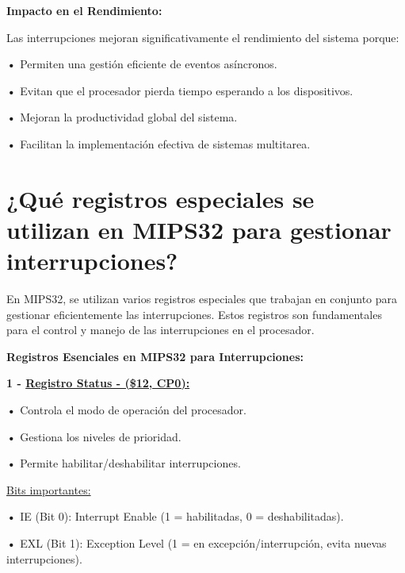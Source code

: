 \documentclass{article}
\begin{document}
\textbf{Impacto en el Rendimiento: }

\quad

{Las interrupciones mejoran significativamente el rendimiento del sistema porque:}

\quad

\textbf{    •} { Permiten una gestión eficiente de eventos asíncronos.}

\textbf{    •} { Evitan que el procesador pierda tiempo esperando a los dispositivos.}

\textbf{    •} { Mejoran la productividad global del sistema.}

\textbf{    •} { Facilitan la implementación efectiva de sistemas multitarea.}

\quad
\newpage





\section{¿Qué registros especiales se utilizan en MIPS32 para gestionar interrupciones?}

\quad

{En MIPS32, se utilizan varios registros especiales que trabajan en conjunto para gestionar eficientemente las interrupciones. Estos registros son fundamentales para el control y manejo de las interrupciones en el procesador.}

\quad

\textbf{Registros Esenciales en MIPS32 para Interrupciones: }

\quad

\textbf{{1 -  } {\underline{Registro Status - (\$12, CP0): }}}

\quad

\textbf{    •} { Controla el modo de operación del procesador.}

\textbf{    •} { Gestiona los niveles de prioridad.}

\textbf{    •} { Permite habilitar/deshabilitar interrupciones.}

\quad

\underline{Bits importantes: }

\quad

\textbf{    •} { IE (Bit 0): Interrupt Enable (1 = habilitadas, 0 = deshabilitadas).}

\textbf{    •} { EXL (Bit 1): Exception Level (1 = en excepción/interrupción, evita nuevas interrupciones).}
\end{document}
